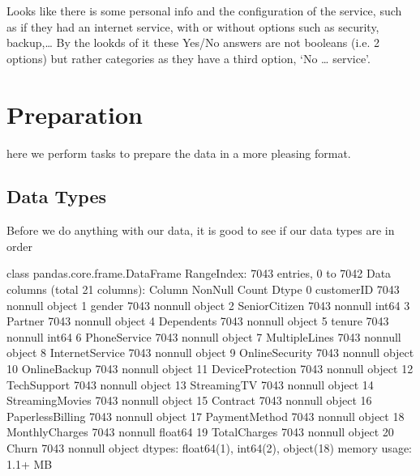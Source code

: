 \documentclass[letterpaper,10pt,english]{jupyterBook}
\begin{document}
\sphinxAtStartPar
Looks like there is some personal info and the configuration of the service, such as if they had an internet service, with or without options such as security, backup,…
By the lookds of it these Yes/No answers are not booleans (i.e. 2 options) but rather categories as they have a third option, ‘No … service’.


\section{Preparation}
\label{\detokenize{c7_case_studies/Churn:preparation}}
\sphinxAtStartPar
here we perform tasks to prepare the data in a more pleasing format.


\subsection{Data Types}
\label{\detokenize{c7_case_studies/Churn:data-types}}
\sphinxAtStartPar
Before we do anything with our data, it is good to see if our data types are in order

\begin{sphinxVerbatim}[commandchars=\\\{\}]
\end{sphinxVerbatim}

\begin{sphinxVerbatim}[commandchars=\\\{\}]
\PYGZlt{}class \PYGZsq{}pandas.core.frame.DataFrame\PYGZsq{}\PYGZgt{}
RangeIndex: 7043 entries, 0 to 7042
Data columns (total 21 columns):
 \PYGZsh{}   Column            Non\PYGZhy{}Null Count  Dtype  
\PYGZhy{}\PYGZhy{}\PYGZhy{}  \PYGZhy{}\PYGZhy{}\PYGZhy{}\PYGZhy{}\PYGZhy{}\PYGZhy{}            \PYGZhy{}\PYGZhy{}\PYGZhy{}\PYGZhy{}\PYGZhy{}\PYGZhy{}\PYGZhy{}\PYGZhy{}\PYGZhy{}\PYGZhy{}\PYGZhy{}\PYGZhy{}\PYGZhy{}\PYGZhy{}  \PYGZhy{}\PYGZhy{}\PYGZhy{}\PYGZhy{}\PYGZhy{}  
 0   customerID        7043 non\PYGZhy{}null   object 
 1   gender            7043 non\PYGZhy{}null   object 
 2   SeniorCitizen     7043 non\PYGZhy{}null   int64  
 3   Partner           7043 non\PYGZhy{}null   object 
 4   Dependents        7043 non\PYGZhy{}null   object 
 5   tenure            7043 non\PYGZhy{}null   int64  
 6   PhoneService      7043 non\PYGZhy{}null   object 
 7   MultipleLines     7043 non\PYGZhy{}null   object 
 8   InternetService   7043 non\PYGZhy{}null   object 
 9   OnlineSecurity    7043 non\PYGZhy{}null   object 
 10  OnlineBackup      7043 non\PYGZhy{}null   object 
 11  DeviceProtection  7043 non\PYGZhy{}null   object 
 12  TechSupport       7043 non\PYGZhy{}null   object 
 13  StreamingTV       7043 non\PYGZhy{}null   object 
 14  StreamingMovies   7043 non\PYGZhy{}null   object 
 15  Contract          7043 non\PYGZhy{}null   object 
 16  PaperlessBilling  7043 non\PYGZhy{}null   object 
 17  PaymentMethod     7043 non\PYGZhy{}null   object 
 18  MonthlyCharges    7043 non\PYGZhy{}null   float64
 19  TotalCharges      7043 non\PYGZhy{}null   object 
 20  Churn             7043 non\PYGZhy{}null   object 
dtypes: float64(1), int64(2), object(18)
memory usage: 1.1+ MB
\end{sphinxVerbatim}
\end{document}
